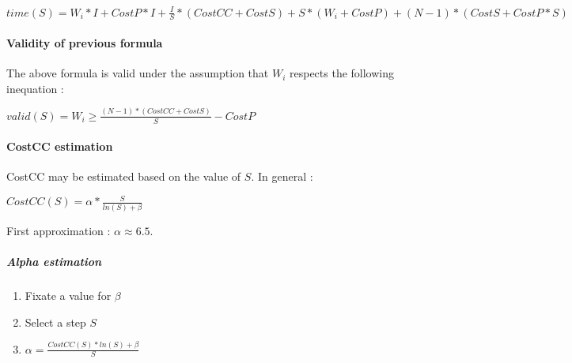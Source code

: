 \documentclass[a4paper,11pt]{article}
\begin{document}
    $ time(S) = W_i * I + CostP * I + \frac{I}{S} * (CostCC + CostS) + S * (W_i + CostP) + (N - 1) * (CostS + CostP * S) $
\medskip

\paragraph{Validity of previous formula}
The above formula is valid under the assumption that $ W_i $ respects the following inequation : 

    $ valid(S) = W_i \geq \frac{(N - 1) * (CostCC + CostS)}{S} - CostP $

\paragraph{CostCC estimation}

CostCC may be estimated based on the value of $ S $. In general :

$ CostCC(S) = \alpha * \frac{S}{ln(S) + \beta} $

First approximation : $ \alpha \approx 6.5 $.

\subparagraph{Alpha estimation}

\begin{enumerate}
    \item Fixate a value for $ \beta $
    \item Select a step $ S $
    \item $ \alpha = \frac{CostCC(S) * ln(S) + \beta}{S} $
\end{enumerate}
\end{document}
